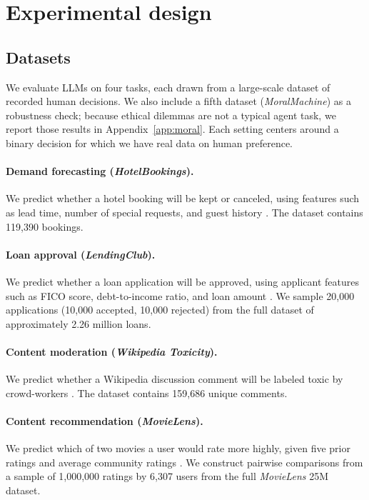 \documentclass{article}
\begin{document}
\section{Experimental design}
\label{sec:design}

\subsection{Datasets}

We evaluate LLMs on four tasks, each drawn from a large-scale dataset of recorded human decisions. We also include a fifth dataset (\emph{MoralMachine}) as a robustness check; because ethical dilemmas are not a typical agent task, we report those results in Appendix~\ref{app:moral}. Each setting centers around a binary decision for which we have real data on human preference.

\paragraph{Demand forecasting (\emph{HotelBookings}).} We predict whether a hotel booking will be kept or canceled, using features such as lead time, number of special requests, and guest history \citep{antonio2019hotel}. The dataset contains 119,390 bookings.

\paragraph{Loan approval (\emph{LendingClub}).} We predict whether a loan application will be approved, using applicant features such as FICO score, debt-to-income ratio, and loan amount \citep{lending_data}. We sample 20,000 applications (10,000 accepted, 10,000 rejected) from the full dataset of approximately 2.26 million loans.

\paragraph{Content moderation (\emph{Wikipedia Toxicity}).} We predict whether a Wikipedia discussion comment will be labeled toxic by crowd-workers \citep{wulczyn2017exmachina}. The dataset contains 159,686 unique comments.

\paragraph{Content recommendation (\emph{MovieLens}).} We predict which of two movies a user would rate more highly, given five prior ratings and average community ratings \citep{harper2015movielens}. We construct pairwise comparisons from a sample of 1,000,000 ratings by 6,307 users from the full \emph{MovieLens} 25M dataset.
\end{document}
